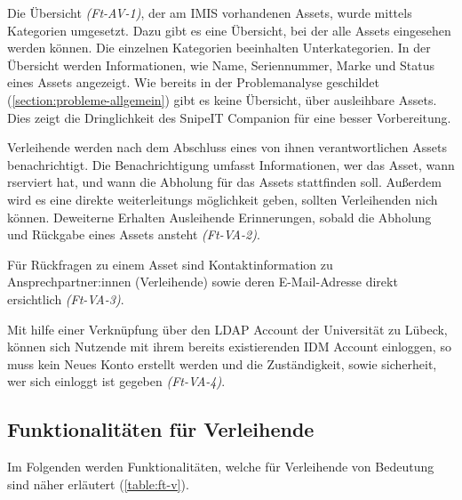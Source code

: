 Die Übersicht \textit{(Ft-AV-1)}, der am IMIS vorhandenen Assets, wurde mittels Kategorien
umgesetzt. Dazu gibt es eine Übersicht, bei der alle Assets eingesehen werden
können. Die einzelnen Kategorien beeinhalten Unterkategorien. In der Übersicht
werden Informationen, wie Name, Seriennummer, Marke und Status eines Assets
angezeigt. Wie bereits in der Problemanalyse geschildet
(\ref{section:probleme-allgemein}) gibt es keine Übersicht, über ausleihbare
Assets. Dies zeigt die Dringlichkeit des SnipeIT Companion für eine besser
Vorbereitung.

Verleihende werden nach dem Abschluss eines von ihnen verantwortlichen Assets
benachrichtigt. Die Benachrichtigung umfasst Informationen, wer das Asset, wann
rserviert hat, und wann die Abholung für das Assets stattfinden soll. Außerdem
wird es eine direkte weiterleitungs möglichkeit geben, sollten Verleihenden nich
können. Deweiterne Erhalten Ausleihende Erinnerungen, sobald die Abholung und
Rückgabe eines Assets ansteht \textit{(Ft-VA-2)}.

Für Rückfragen zu einem Asset sind Kontaktinformation zu Ansprechpartner:innen
(Verleihende) sowie deren E-Mail-Adresse direkt ersichtlich \textit{(Ft-VA-3)}.

Mit hilfe einer Verknüpfung über den LDAP Account der Universität zu Lübeck, können sich
Nutzende mit ihrem bereits existierenden IDM Account einloggen, so muss kein Neues Konto erstellt werden
und die Zuständigkeit, sowie sicherheit, wer sich einloggt ist gegeben \textit{(Ft-VA-4)}.

\subsection{Funktionalitäten für Verleihende}
Im Folgenden werden Funktionalitäten, welche für Verleihende von Bedeutung sind
näher erläutert (\ref{table:ft-v}).

